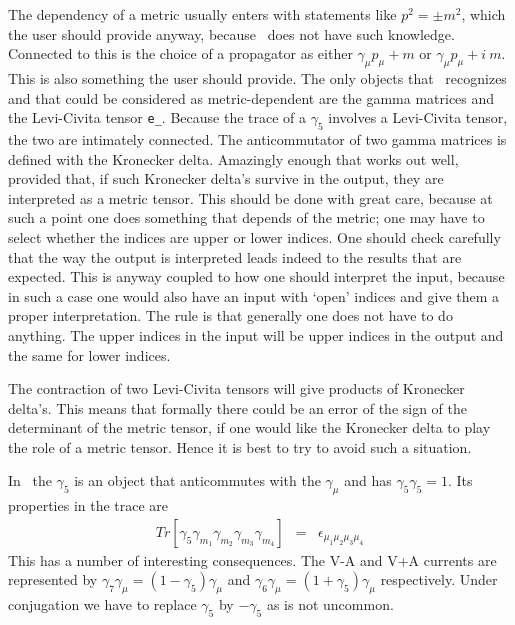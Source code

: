\noindent The dependency of a metric usually enters with statements like 
$p^2 = \pm m^2$, which the user should provide anyway, because \FORM\ does 
not have such knowledge. Connected to this is the choice of a 
propagator as either $\gamma_\mu p_\mu + m$ or 
$\gamma_\mu p_\mu + i\ m$. This is also something the user should provide. 
The only objects that \FORM\ recognizes and that could be considered as 
metric-dependent are the gamma matrices and the 
Levi-Civita tensor 
\verb:e_:. Because the trace of a $\gamma_5$ involves a Levi-Civita tensor, 
the two are intimately connected. The anticommutator of two gamma matrices 
is defined with the Kronecker delta. Amazingly enough that works out well, 
provided that, if such Kronecker delta's survive in the output, they are 
interpreted as a metric tensor. This should be done with great care, 
because at such a point one does something that depends of the metric; one 
may have to select whether the indices are upper or lower indices. One 
should check carefully that the way the output is interpreted leads indeed 
to the results that are expected. This is anyway coupled to how one should 
interpret the input, because in such a case one would also have an input 
with `open' indices and give them a proper interpretation. The rule is that 
generally one does not have to do anything. The upper indices in the input 
will be upper indices in the output and the same for lower indices. \hfill 
\vspace{2mm}

\noindent The contraction of two Levi-Civita tensors will give products of 
Kronecker delta's. This means that formally there could be an error of the 
sign of the determinant of the metric tensor, if one would like the 
Kronecker delta to play the role of a metric tensor. Hence it is best to 
try to avoid such a situation. \hfill \vspace{2mm}

\noindent In \FORM\ the $\gamma_5$ is an object that anticommutes with 
the $\gamma_\mu$ and has $\gamma_5\gamma_5 = 1$. Its properties 
in the trace are 
\begin{eqnarray}
	Tr[\gamma_5\gamma_{m_1}\gamma_{m_2}\gamma_{m_3}\gamma_{m_4}] & = &
		\epsilon_{\mu_1\mu_2\mu_3\mu_4} \nonumber
\end{eqnarray}
This has a number of interesting consequences. The V-A and V+A currents are 
represented by $\gamma_7\gamma_\mu = (1-\gamma_5)\gamma_\mu$ and 
$\gamma_6\gamma_\mu = (1+\gamma_5)\gamma_\mu$ respectively. Under 
conjugation we have to replace $\gamma_5$ by $-\gamma_5$ as is not 
uncommon. \hfill \vspace{2mm}


